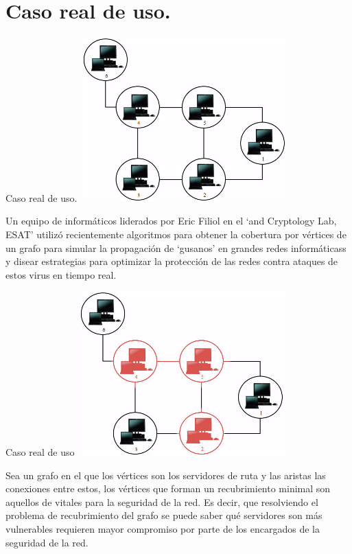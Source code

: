 \documentclass[10pt]{beamer}
\begin{document}
\section{Caso real de uso.}
\begin{frame}{Caso real de uso.}{}  
  \centering\includegraphics[width=0.6\textwidth]{inicial.jpg}
  
Un equipo de informáticos liderados por Eric Filiol en el `and Cryptology Lab, ESAT' utilizó recientemente algoritmos para obtener la cobertura por vértices de un grafo para simular la propagación de `gusanos' en grandes redes informáticass y disear estrategias para optimizar la protección de las redes contra ataques de estos virus en tiempo real.
\end{frame}

\begin{frame}{Caso real de uso}{}
\centering\includegraphics[width=0.6\textwidth]{cover.jpg}

Sea un grafo en el que los vértices son los servidores de ruta y las aristas las conexiones entre estos, los vértices que forman un recubrimiento minimal son aquellos de vitales para la seguridad de la red. Es decir, que resolviendo el problema de recubrimiento del grafo se puede saber qué servidores son más vulnerables  requieren mayor compromiso por parte de los encargados de la seguridad de la red.

\end{frame}
\end{document}
